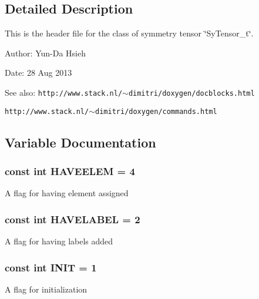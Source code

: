 \subsection{Detailed Description}
This is the header file for the class of symmetry tensor \char`\"{}Sy\-Tensor\_\-t\char`\"{}. 

\begin{Desc}
\item[Author:]Yun-Da Hsieh \end{Desc}
\begin{Desc}
\item[Date:]28 Aug 2013\end{Desc}
\begin{Desc}
\item[See also:]\tt{http://www.stack.nl/$\sim$dimitri/doxygen/docblocks.html} 

\tt{http://www.stack.nl/$\sim$dimitri/doxygen/commands.html} \end{Desc}


\subsection{Variable Documentation}
\subsubsection{\setlength{\rightskip}{0pt plus 5cm}const int \bf{HAVEELEM} = 4}\label{df/d91/SyTensor_8h_c005d52569c749f62fb23dc7b723ba8e}


A flag for having element assigned 
\subsubsection{\setlength{\rightskip}{0pt plus 5cm}const int \bf{HAVELABEL} = 2}\label{df/d91/SyTensor_8h_9937638a959e93918d271a7bbce73333}


A flag for having labels added 
\subsubsection{\setlength{\rightskip}{0pt plus 5cm}const int \bf{INIT} = 1}\label{df/d91/SyTensor_8h_f21cb7981a4b712f47776cd86d4004c0}


A flag for initialization 